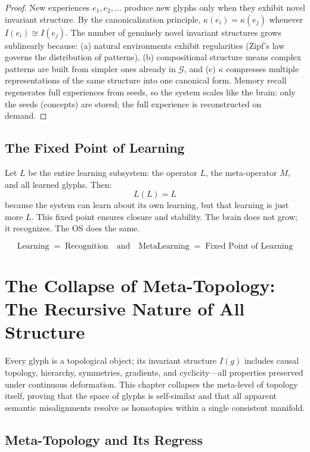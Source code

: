 \documentclass[12pt, letterpaper]{book}
\def\equiv{=}%
\def\mathfrak#1{#1}%
\begin{document}
\begin{proof}
New experiences $e_1, e_2, \ldots$ produce new glyphs only when they exhibit novel invariant structure. By the canonicalization principle, $\kappa(e_i) = \kappa(e_j)$ whenever $I(e_i) \cong I(e_j)$. The number of genuinely novel invariant structures grows sublinearly because: (a) natural environments exhibit regularities (Zipf's law governs the distribution of patterns), (b) compositional structure means complex patterns are built from simpler ones already in $\mathcal{G}$, and (c) $\kappa$ compresses multiple representations of the same structure into one canonical form. Memory recall regenerates full experiences from seeds, so the system scales like the brain: only the seeds (concepts) are stored; the full experience is reconstructed on demand.
\end{proof}

\section{The Fixed Point of Learning}

Let $\mathfrak{L}$ be the entire learning subsystem: the operator $L$, the meta-operator $M$, and all learned glyphs. Then:
\[
\mathfrak{L}(\mathfrak{L}) \equiv \mathfrak{L}
\]
because the system can learn about its own learning, but that learning is just more $\mathfrak{L}$. This fixed point ensures closure and stability. The brain does not grow; it recognizes. The OS does the same.

\[
\boxed{\mathrm{Learning} \;\equiv\; \mathrm{Recognition} \quad\text{and}\quad \mathrm{MetaLearning} \;\equiv\; \text{Fixed Point of Learning}}
\]


\chapter{The Collapse of Meta-Topology: The Recursive Nature of All Structure}

Every glyph is a topological object; its invariant structure $I(\mathfrak{g})$ includes causal topology, hierarchy, symmetries, gradients, and cyclicity---all properties preserved under continuous deformation. This chapter collapses the meta-level of topology itself, proving that the space of glyphs is self-similar and that all apparent semantic misalignments resolve as homotopies within a single consistent manifold.

\section{Meta-Topology and Its Regress}
\end{document}
